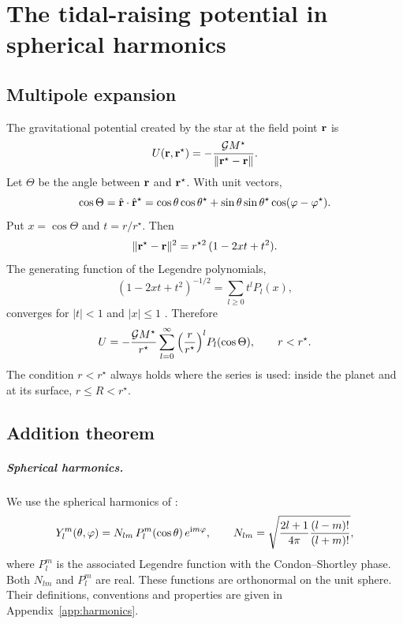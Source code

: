 \chapter{The tidal-raising potential in spherical harmonics}\label{ch:potential}

\section{Multipole expansion}
The gravitational potential created by the star at the field point $\mathbf r$ is
\begin{equation}
  U(\mathbf r,\mathbf r^\star)=-\frac{\mathcal{G} M^\star}{\|\mathbf r^\star-\mathbf r\|}. \label{eq:U}
\end{equation}
Let $\Theta$ be the angle between $\mathbf r$ and $\mathbf r^\star$. With unit vectors,
\begin{equation}
  \cos\Theta=\hat{\mathbf r}\cdot\hat{\mathbf r}^\star=\cos\theta\cos\theta^\star+\sin\theta\sin\theta^\star\cos(\varphi-\varphi^\star). \label{eq:cosTheta}
\end{equation}
Put $x=\cos\Theta$ and $t=r/r^\star$. Then
\[
  \|\mathbf r^\star-\mathbf r\|^2=r^{\star2}\,(1-2xt+t^2).
\]
The generating function of the Legendre polynomials,
\[
  (1-2xt+t^2)^{-1/2}=\sum_{l\ge0}t^lP_l(x),
\]
converges for $|t|<1$ and $|x|\le1$ \citep[e.g.][\S1.2]{Kaula2000}. Therefore
\begin{equation}
  U=-\frac{\mathcal{G} M^\star}{r^\star}\sum_{l=0}^{\infty}\Big(\frac{r}{r^\star}\Big)^lP_l(\cos\Theta),\qquad r<r^\star. \label{eq:U-legendre}
\end{equation}
The condition $r<r^\star$ always holds where the series is used: inside the planet and at its surface, $r\le R<r^\star$.

\section{Addition theorem}
\paragraph{Spherical harmonics.} We use the spherical harmonics of \citet[eq.~5.2(1)]{Varshalovich1988}:
\begin{equation}
  Y_l^m(\theta,\varphi)=N_{lm}\,P_l^m(\cos\theta)\,e^{\mathrm{i} m\varphi},\qquad N_{lm}=\sqrt{\frac{2l+1}{4\pi}\frac{(l-m)!}{(l+m)!}}, \label{eq:Ylm-main}
\end{equation}
where $P_l^m$ is the associated Legendre function with the Condon--Shortley phase. Both $N_{lm}$ and $P_l^m$ are real. These functions are orthonormal on the unit sphere. Their definitions, conventions and properties are given in Appendix~\ref{app:harmonics}.

